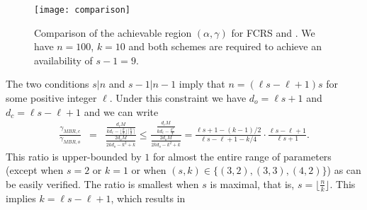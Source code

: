 \documentclass[journal,onecolumn,draftcls]{IEEEtran}
\begin{document}
\begin{figure}
\centering
\texttt{[image: comparison]}
\caption{Comparison of the achievable region $(\alpha,\gamma)$ for FCRS and \cite{dimakis2010network}. We have $n = 100$, $k = 10$ and both schemes are required to achieve an availability of $s-1 = 9$.}
\label{fig:comparisonfunctional}
\end{figure}
The two conditions $s|n$ and $s-1|n-1$ imply that $n = (\ell s - \ell + 1)s$ for some positive integer $\ell$. Under this constraint we have $d_o = \ell s + 1$ and $d_c = \ell s  -\ell + 1$ and we can write
\begin{eqnarray*}
\frac{\gamma_{MBR,c}}{\gamma_{MBR,o}} & = &                    \frac{\frac{d_cM}{kd_c - \lfloor\frac{k}{2}\rfloor\lceil\frac{k}{2}\rceil} }{\frac{2d_o{M}}{2kd_o - k^2 + k}}     \le \frac{\frac{d_c{M}}{kd_c - \frac{k^2}{4}}}{\frac{2d_o{M}}{2kd_o - k^2 + k}}  = \frac{\ell s + 1 - (k-1)/2}{\ell s -\ell +  1 - k/4}\cdot \frac{\ell s -\ell + 1}{\ell s +1}.
\end{eqnarray*}
This ratio is upper-bounded by $1$ for almost the entire range of parameters (except when $s = 2$ or $k =1$ or when $(s,k) \in\{(3,2),(3,3),(4,2)\}$) as can be easily verified. The ratio is smallest when $s$ is maximal, that is, $s= \lfloor\frac{n}{k}\rfloor$. This implies $k= \ell s -\ell+ 1 $, which results in
\end{document}
